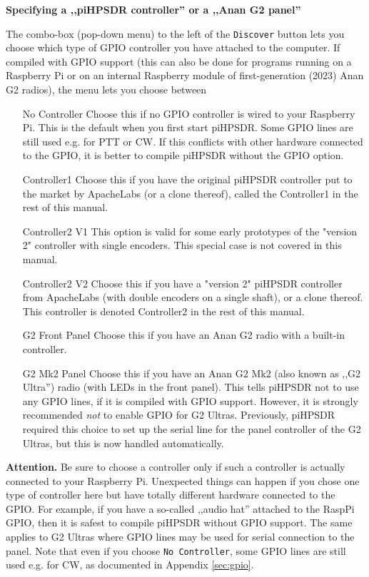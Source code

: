 \documentclass[12pt]{book}
\def\rett#1{\texttt{\color{red}#1}}
\def\pH{pi\-HPSDR\xspace}
\begin{document}
\textbf{Specifying a ,,piHPSDR controller'' or a ,,Anan G2 panel''}


The combo-box (pop-down menu) to the left of the \rett{Discover} button lets you choose which type of GPIO
controller you
have attached to the computer.  If compiled with GPIO support (this can also be done for
programs running on a Raspberry Pi or on an internal Raspberry module of first-generation (2023) Anan G2 radios),
the menu lets you choose between

\begin{itemize}[font=\texttt, left=80pt]
\item[No Controller]{Choose this if no GPIO controller is wired to your Raspberry Pi. This is the default
when you first start \pH. Some GPIO lines are still used e.g. for PTT or CW. If this conflicts with other
hardware connected to the GPIO, it is better to compile \pH without the GPIO option.}
\item[Controller1]{Choose this if you have the original \pH controller put to the market by ApacheLabs
(or a clone thereof), called the Controller1 in the rest
of this manual.}
\item[Controller2 V1]{This option is valid for some early prototypes of the "version 2" controller with
single encoders. This special case is not covered in this manual.}
\item[Controller2 V2]{Choose this if you have a "version 2" \pH controller from ApacheLabs (with double encoders
on a single shaft), or a clone thereof.
This controller is denoted Controller2 in the rest of this manual.}
\item[G2 Front Panel]{Choose this if you have an Anan G2 radio with a built-in controller.}
\item[G2 Mk2 Panel]{Choose this if you have an Anan G2 Mk2 (also known as ,,G2 Ultra'')
radio (with LEDs in the front panel).
This tells \pH not to use any GPIO lines, if it is compiled with GPIO support. However, it is
strongly recommended \textit{not} to enable GPIO for G2 Ultras. Previously, \pH required this choice
to set up the serial line for the panel controller of the G2 Ultras, but this is now handled
automatically.}
\end{itemize}

\textbf{Attention.} Be sure to choose a controller only if such a controller is actually connected to your
Raspberry Pi. Unexpected things can happen if you chose one type of controller here but have totally different
hardware connected to the GPIO. For example, if you have a so-called ,,audio hat'' attached to the RaspPi
GPIO, then it is safest to compile \pH without GPIO support.
The same applies to G2 Ultras where GPIO lines may be used for serial connection
to the panel. Note that even if you choose \texttt{No Controller}, some GPIO lines are still used
e.g. for CW, as documented in Appendix \ref{sec:gpio}.
\end{document}
